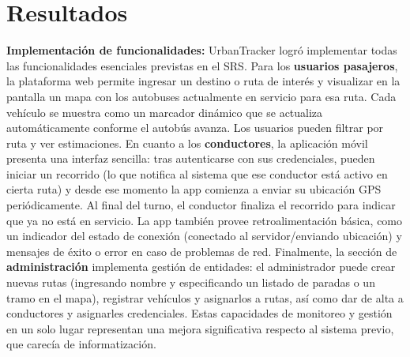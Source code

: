 \section{Resultados}
\textbf{Implementación de funcionalidades:} UrbanTracker logró implementar todas las funcionalidades esenciales previstas en el SRS. Para los \textbf{usuarios pasajeros}, la plataforma web permite ingresar un destino o ruta de interés y visualizar en la pantalla un mapa con los autobuses actualmente en servicio para esa ruta. Cada vehículo se muestra como un marcador dinámico que se actualiza automáticamente conforme el autobús avanza. Los usuarios pueden filtrar por ruta y ver estimaciones. En cuanto a los \textbf{conductores}, la aplicación móvil presenta una interfaz sencilla: tras autenticarse con sus credenciales, pueden iniciar un recorrido (lo que notifica al sistema que ese conductor está activo en cierta ruta) y desde ese momento la app comienza a enviar su ubicación GPS periódicamente. Al final del turno, el conductor finaliza el recorrido para indicar que ya no está en servicio. La app también provee retroalimentación básica, como un indicador del estado de conexión (conectado al servidor/enviando ubicación) y mensajes de éxito o error en caso de problemas de red. Finalmente, la sección de \textbf{administración} implementa gestión de entidades: el administrador puede crear nuevas rutas (ingresando nombre y especificando un listado de paradas o un tramo en el mapa), registrar vehículos y asignarlos a rutas, así como dar de alta a conductores y asignarles credenciales. Estas capacidades de monitoreo y gestión en un solo lugar representan una mejora significativa respecto al sistema previo, que carecía de informatización.

